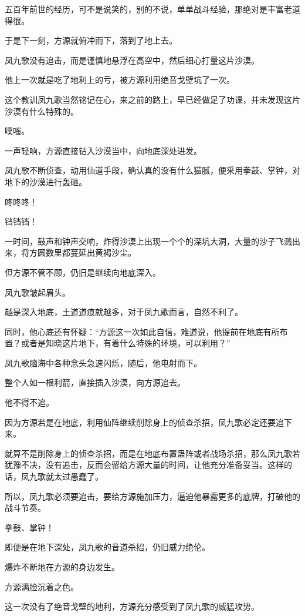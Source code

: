 \begin{this_body}
五百年前世的经历，可不是说笑的，别的不说，单单战斗经验，那绝对是丰富老道得很。

于是下一刻，方源就俯冲而下，落到了地上去。

凤九歌没有追击，而是谨慎地悬浮在高空中，然后细心打量这片沙漠。

他上一次就是吃了地利上的亏，被方源利用绝音戈壁坑了一次。

这个教训凤九歌当然铭记在心，来之前的路上，早已经做足了功课，并未发现这片沙漠有什么特殊的。

噗嗤。

一声轻响，方源直接钻入沙漠当中，向地底深处进发。

凤九歌不断侦查，动用仙道手段，确认真的没有什么猫腻，便采用拳鼓、掌钟，对地下的沙漠进行轰砸。

咚咚咚！

铛铛铛！

一时间，鼓声和钟声交响，炸得沙漠上出现一个个的深坑大洞，大量的沙子飞溅出来，将方圆数里都蔓延出黄褐沙尘。

但方源不管不顾，仍旧是继续向地底深入。

凤九歌皱起眉头。

越是深入地底，土道道痕就越多，对于凤九歌而言，自然不利了。

同时，他心底还有怀疑：“方源这一次如此自信，难道说，他提前在地底有所布置？或者是知晓这片地下，有着什么特殊的环境，可以利用？”

凤九歌脑海中各种念头急速闪烁，随后，他电射而下。

整个人如一根利箭，直接插入沙漠，向方源追去。

他不得不追。

因为方源若是在地底，利用仙阵继续削除身上的侦查杀招，凤九歌必定还要追下来。

就算不是削除身上的侦查杀招，而是在地底布置蛊阵或者战场杀招，那么凤九歌若犹豫不决，没有追击，反而会留给方源大量的时间，让他充分准备妥当。这样的话，凤九歌就太过愚蠢了。

所以，凤九歌必须要追击，要给方源施加压力，逼迫他暴露更多的底牌，打破他的战斗节奏。

拳鼓、掌钟！

即便是在地下深处，凤九歌的音道杀招，仍旧威力绝伦。

爆炸不断地在方源的身边发生。

方源满脸沉着之色。

这一次没有了绝音戈壁的地利，方源充分感受到了凤九歌的威猛攻势。


\end{this_body}

